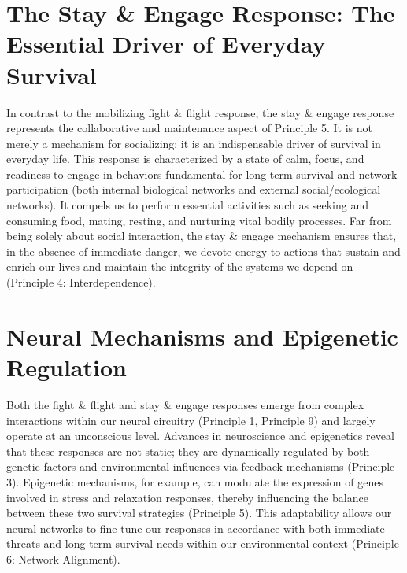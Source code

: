 \documentclass[12pt,openany]{book}
\begin{document}
\section{The Stay \& Engage Response: The Essential Driver of Everyday Survival}
In contrast to the mobilizing fight \& flight response, the stay \& engage response represents the collaborative and maintenance aspect of Principle 5. It is not merely a mechanism for socializing; it is an indispensable driver of survival in everyday life. This response is characterized by a state of calm, focus, and readiness to engage in behaviors fundamental for long-term survival and network participation (both internal biological networks and external social/ecological networks). It compels us to perform essential activities such as seeking and consuming food, mating, resting, and nurturing vital bodily processes. Far from being solely about social interaction, the stay \& engage mechanism ensures that, in the absence of immediate danger, we devote energy to actions that sustain and enrich our lives and maintain the integrity of the systems we depend on (Principle 4: Interdependence). %

\section{Neural Mechanisms and Epigenetic Regulation}
Both the fight \& flight and stay \& engage responses emerge from complex interactions within our neural circuitry (Principle 1, Principle 9) and largely operate at an unconscious level. Advances in neuroscience and epigenetics reveal that these responses are not static; they are dynamically regulated by both genetic factors and environmental influences via feedback mechanisms (Principle 3). Epigenetic mechanisms, for example, can modulate the expression of genes involved in stress and relaxation responses, thereby influencing the balance between these two survival strategies (Principle 5). This adaptability allows our neural networks to fine-tune our responses in accordance with both immediate threats and long-term survival needs within our environmental context (Principle 6: Network Alignment). %
\end{document}
